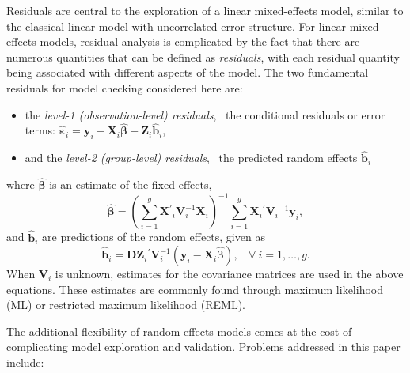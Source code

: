 \documentclass[12pt]{article}
\newcommand{\hh}[1]{{\color{orange} #1}}
\newcommand{\inv}{\ensuremath{^{-1}}}
\newcommand{\trans}{\ensuremath{^\prime}}
\begin{document}
Residuals are central to the exploration of a linear mixed-effects model, similar to the classical linear model with uncorrelated error structure. For linear mixed-effects models, residual analysis is complicated by the fact that there are numerous quantities that can be defined as \emph{residuals}, with each residual quantity being associated with different aspects of the model. The two fundamental residuals for model checking considered here are:
%
\begin{itemize}
\item the \emph{level-1 (observation-level) residuals}, ~the conditional residuals or error terms: $\widehat{\bm{\varepsilon}}_i = \bm{y}_i - \bm{X}_i \widehat{\bm{\beta}} - \bm{Z}_i \widehat{\bm{b}}_i$,

\item and the \emph{level-2 (group-level) residuals}, ~the predicted random effects $\widehat{\bm{b}}_i$
\end{itemize}
%
where $\widehat{\bm{\beta}}$ is an estimate of the fixed effects, %
\begin{equation}\label{eq:glsb}
	\widehat{\bm{\beta}} = 
	\left(\sum^g_{i=1} \bm{X}\trans_i \bm{V}^{-1}_i \bm{X}_i \right)^{-1} 
	\sum^g_{i=1} \bm{X}_i\trans \bm{V}_i\inv \bm{y}_i,
\end{equation}
and $\widehat{\bm{b}}_i$ are predictions of the random effects, given as
\begin{equation}\label{eq:eb}
	\widehat{\bm{b}}_i = \bm{D} \bm{Z}_i\trans \bm{V}_i^{-1} 
	\left(\bm{y}_i - \bm{X}_i \widehat{\bm{\beta}} \right), \ \ \ \ \forall\ i = 1, \ldots, g.
\end{equation}
%
When $\bm{V}_i$ is unknown, estimates for the covariance matrices are used in the above equations. These estimates are commonly found through maximum likelihood (ML) or restricted maximum likelihood (REML). %

The additional flexibility of random effects models comes at the cost of complicating model exploration and validation. %
Problems addressed in this paper include:
\end{document}
